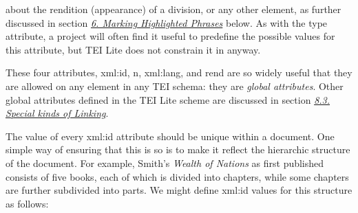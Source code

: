 \documentclass[11pt,twoside]{article}\makeatletter
\begin{document}
about the rendition (appearance) of a division, or any other element,
as further discussed in section \textit{\hyperref[U5-hilites]{6. Marking Highlighted Phrases}} below. As with the
type attribute, a project will often find it useful to
predefine the possible values for this attribute, but TEI Lite does
not constrain it in anyway. \par  These four attributes, xml:id, n,
xml:lang, and rend are so widely useful that
they are allowed on any element in any TEI schema: they are
\emph{global attributes}.  Other global attributes defined in
the TEI Lite scheme are discussed in section \textit{\hyperref[xatts]{8.3. Special kinds of Linking}}.\par The value of every xml:id attribute should be unique
within a document. One simple way of ensuring that this is so is to
make it reflect the hierarchic structure of the document. For example,
Smith's \textit{Wealth of Nations} as first published consists
of five books, each of which is divided into chapters, while some
chapters are further subdivided into parts. We might define
xml:id values for this structure as follows:
\end{document}
